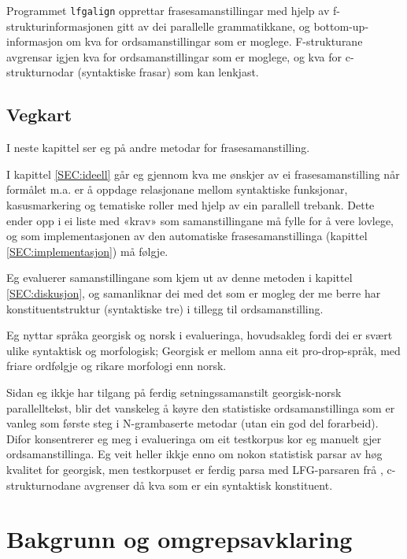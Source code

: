 \documentclass[11pt,a4paper,oneside,draft]{book}
\begin{document}
Programmet \texttt{lfgalign} opprettar frasesamanstillingar med hjelp av
f-strukturinformasjonen gitt av dei parallelle grammatikkane, og
bottom-up-informasjon om kva for ordsamanstillingar som er
moglege. F-strukturane avgrensar igjen kva for ordsamanstillingar som
er moglege, og kva for c-strukturnodar (syntaktiske frasar) som kan
lenkjast.


\section{Vegkart}
\label{sec-1.1}

I neste kapittel ser eg på andre metodar for frasesamanstilling.

I kapittel \ref{SEC:ideell} går eg gjennom kva me ønskjer av ei
frasesamanstilling når formålet m.a. er å oppdage relasjonane mellom
syntaktiske funksjonar, kasusmarkering og tematiske roller med hjelp
av ein parallell trebank. Dette ender opp i ei liste med «krav» som
samanstillingane må fylle for å vere lovlege, og som implementasjonen
av den automatiske frasesamanstillinga (kapittel
\ref{SEC:implementasjon}) må følgje.

Eg evaluerer samanstillingane som kjem ut av denne metoden i kapittel
\ref{SEC:diskusjon}, og samanliknar dei med det som er mogleg der me
berre har konstituentstruktur (syntaktiske tre) i tillegg til
ordsamanstilling.

Eg nyttar språka georgisk og norsk i evalueringa, hovudsakleg fordi
dei er svært ulike syntaktisk og morfologisk; Georgisk er mellom anna
eit pro-drop-språk, med friare ordfølgje og rikare morfologi enn
norsk.  

Sidan eg ikkje har tilgang på ferdig setningssamanstilt georgisk-norsk
parallelltekst, blir det vanskeleg å køyre den statistiske
ordsamanstillinga som er vanleg som første steg i N-grambaserte
metodar (utan ein god del forarbeid). Difor konsentrerer eg meg i
evalueringa om eit testkorpus kor eg manuelt gjer
ordsamanstillinga. Eg veit heller ikkje enno om nokon statistisk
parsar av høg kvalitet for georgisk, men testkorpuset er ferdig parsa
med LFG-parsaren frå \citet{meurer2008cgg}, c-strukturnodane avgrenser
då kva som er ein syntaktisk konstituent.


\chapter{Bakgrunn og omgrepsavklaring}
\label{sec-2}
\end{document}
